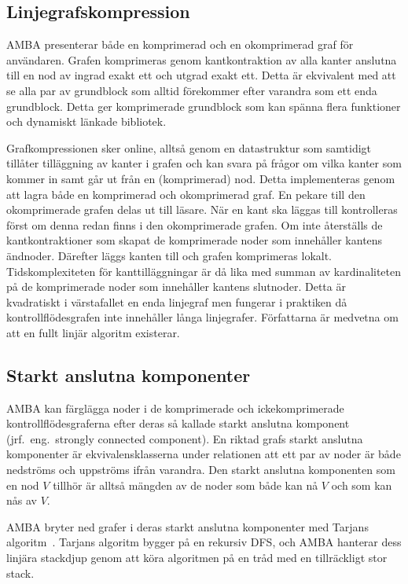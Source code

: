 \subsection{Linjegrafskompression}

AMBA presenterar både en komprimerad och en okomprimerad graf för användaren.
Grafen komprimeras genom kantkontraktion av alla kanter anslutna till en nod av
ingrad exakt ett och utgrad exakt ett. Detta är ekvivalent med att se alla par
av grundblock som alltid förekommer efter varandra som ett enda grundblock.
Detta ger komprimerade grundblock som kan spänna flera funktioner och dynamiskt
länkade bibliotek.

Grafkompressionen sker online, alltså genom en datastruktur som samtidigt
tillåter tilläggning av kanter i grafen och kan svara på frågor om vilka kanter
som kommer in samt går ut från en (komprimerad) nod. Detta implementeras genom
att lagra både en komprimerad och okomprimerad graf. En pekare till den
okomprimerade grafen delas ut till läsare. När en kant ska läggas till
kontrolleras först om denna redan finns i den okomprimerade grafen. Om inte
återställs de kantkontraktioner som skapat de komprimerade noder som innehåller
kantens ändnoder. Därefter läggs kanten till och grafen komprimeras lokalt.
Tidskomplexiteten för kanttilläggningar är då lika med summan av kardinaliteten
på de komprimerade noder som innehåller kantens slutnoder. Detta är kvadratiskt
i värstafallet en enda linjegraf men fungerar i praktiken då
kontrollflödesgrafen inte innehåller långa linjegrafer. Författarna är medvetna
om att en fullt linjär algoritm existerar.

\subsection{Starkt anslutna komponenter}

AMBA kan färglägga noder i de komprimerade och ickekomprimerade
kontrollflödesgraferna efter deras så kallade starkt anslutna komponent (jrf.\
eng.\ strongly connected component). En riktad grafs starkt anslutna komponenter
är ekvivalensklasserna under relationen att ett par av noder är både nedströms
och uppströms ifrån varandra. Den starkt anslutna komponenten som en nod $V$
tillhör är alltså mängden av de noder som både kan nå $V$ och som kan nås av
$V$.

AMBA bryter ned grafer i deras starkt anslutna komponenter med Tarjans
algoritm~\cite{tarjan}. Tarjans algoritm bygger på en rekursiv DFS, och AMBA
hanterar dess linjära stackdjup genom att köra algoritmen på en tråd med en
tillräckligt stor stack.

